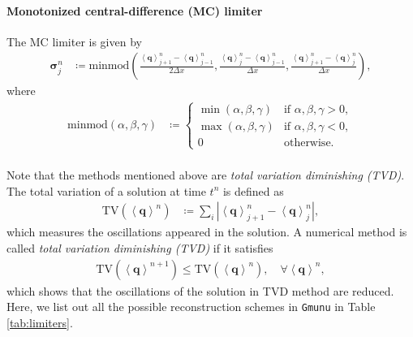 \paragraph{Monotonized central-difference (MC) limiter}
The MC limiter \cite{van1974towards} is given by
\begin{align}
    \mathbf{\sigma}^n_j &\coloneqq \text{minmod}\left(
    \frac{\left\langle \mathbf{q} \right\rangle^n_{j+1}-\left\langle \mathbf{q} \right\rangle^n_{j-1}}{2 \Delta x},
    \frac{\left\langle \mathbf{q} \right\rangle^n_j-\left\langle \mathbf{q} \right\rangle^n_{j-1}}{\Delta x},
    \frac{\left\langle \mathbf{q} \right\rangle^n_{j+1}-\left\langle \mathbf{q} \right\rangle^n_{j}}{\Delta x} \right),
\end{align}
where
\begin{align}
    \text{minmod}\left(\alpha, \beta, \gamma \right) &\coloneqq
    \begin{cases}
        \min\left(\alpha, \beta, \gamma\right) & \text{if } \alpha,\beta,\gamma > 0, \\
        \max\left(\alpha, \beta, \gamma\right) & \text{if } \alpha,\beta,\gamma < 0, \\
        0 & \text{otherwise}.
    \end{cases}
\end{align}\\
Note that the methods mentioned above are \textit{total variation diminishing (TVD)}.
The total variation of a solution at time $t^n$ is defined as
\begin{align}
    \text{TV}\left( \left\langle \mathbf{q} \right\rangle^n \right) &\coloneqq 
    \sum_i \left| \left\langle \mathbf{q} \right\rangle^n_{j+1} - \left\langle \mathbf{q} \right\rangle^n_j \right|,
\end{align}
which measures the oscillations appeared in the solution.
A numerical method is called \textit{total variation diminishing (TVD)} if it satisfies
\begin{align}
    \text{TV}\left( \left\langle \mathbf{q} \right\rangle^{n+1} \right) \leq
    \text{TV}\left( \left\langle \mathbf{q} \right\rangle^n \right), \quad \forall \left\langle \mathbf{q} \right\rangle^n,
\end{align}
which shows that the oscillations of the solution in TVD method are reduced.\\
Here, we list out all the possible reconstruction schemes in \texttt{Gmunu} in Table \ref{tab:limiters}.
